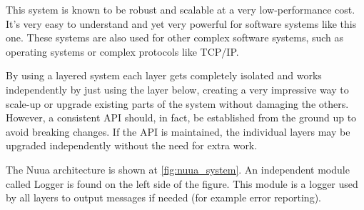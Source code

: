 This system is known to be robust and scalable at a very low-performance cost. It's very easy to understand and yet very powerful
for software systems like this one. These systems are also used for other complex software systems, such as operating
systems or complex protocols like TCP/IP.

By using a layered system each layer gets completely isolated and works independently by just using the layer below,
creating a very impressive way to scale-up or upgrade existing parts of the system without damaging the others.
However, a consistent API should, in fact, be established from the ground up to avoid breaking changes.
If the API is maintained, the individual layers may be upgraded independently without the need for extra work.

The Nuua architecture is shown at \autoref{fig:nuua_system}. An independent module called Logger is found
on the left side of the figure. This module is a logger used by all layers to output messages if needed (for example error reporting).

